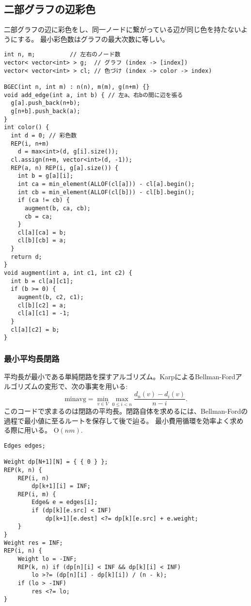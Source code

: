 \subsection{二部グラフの辺彩色}

二部グラフの辺に彩色をし、同一ノードに繋がっている辺が同じ色を持たないようにする。
最小彩色数はグラフの最大次数に等しい。

\begin{lstlisting}
int n, m;          // 左右のノード数
vector< vector<int> > g;  // グラフ (index -> [index])
vector< vector<int> > cl; // 色づけ (index -> color -> index)

BGEC(int n, int m) : n(n), m(m), g(n+m) {}
void add_edge(int a, int b) { // 左a、右bの間に辺を張る
  g[a].push_back(n+b);
  g[n+b].push_back(a);
}
int color() {
  int d = 0; // 彩色数
  REP(i, n+m)
    d = max<int>(d, g[i].size());
  cl.assign(n+m, vector<int>(d, -1));
  REP(a, n) REP(i, g[a].size()) {
    int b = g[a][i];
    int ca = min_element(ALLOF(cl[a])) - cl[a].begin();
    int cb = min_element(ALLOF(cl[b])) - cl[b].begin();
    if (ca != cb) {
      augment(b, ca, cb);
      cb = ca;
    }
    cl[a][ca] = b;
    cl[b][cb] = a;
  }
  return d;
}
void augment(int a, int c1, int c2) {
  int b = cl[a][c1];
  if (b >= 0) {
    augment(b, c2, c1);
    cl[b][c2] = a;
    cl[a][c1] = -1;
  }
  cl[a][c2] = b;
}
\end{lstlisting}



\subsubsection{最小平均長閉路}

平均長が最小である単純閉路を探すアルゴリズム。KarpによるBellman-Fordアルゴリズムの変形で、次の事実を用いる:
\begin{equation*}
\mathrm{minavg} = \min_{v \in V} \max_{0 \leq i < n}
 \frac{d_n(v) - d_i(v)}{n - i}.
\end{equation*} %
このコードで求まるのは閉路の平均長。閉路自体を求めるには、Bellman-Fordの過程で最小値に至るルートを保存して後で辿る。
最小費用循環を効率よく求める際に用いる。
$ \mathrm{O}(nm) $.

\begin{lstlisting}
Edges edges;

Weight dp[N+1][N] = { { 0 } };
REP(k, n) {
    REP(i, n)
        dp[k+1][i] = INF;
    REP(i, m) {
        Edge& e = edges[i];
        if (dp[k][e.src] < INF)
            dp[k+1][e.dest] <?= dp[k][e.src] + e.weight;
    }
}
Weight res = INF;
REP(i, n) {
    Weight lo = -INF;
    REP(k, n) if (dp[n][i] < INF && dp[k][i] < INF)
        lo >?= (dp[n][i] - dp[k][i]) / (n - k);
    if (lo > -INF)
        res <?= lo;
}
\end{lstlisting}



